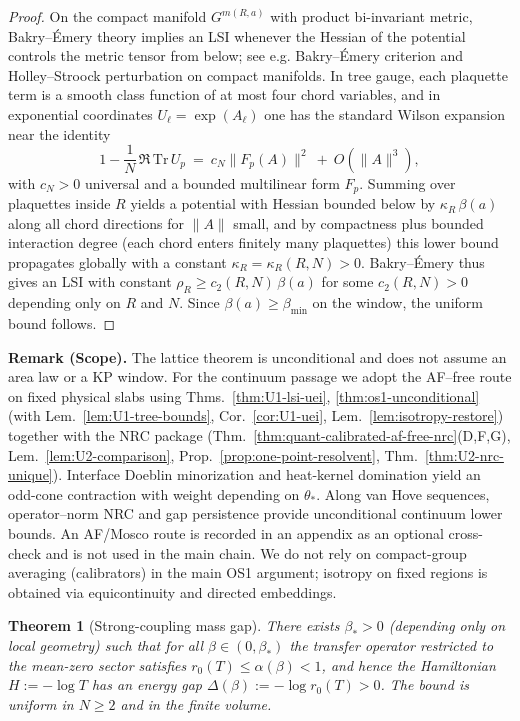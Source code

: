 \documentclass[11pt]{amsart}
\theoremstyle{plain}
\newtheorem{theorem}{Theorem}[section]
\theoremstyle{definition}
\theoremstyle{remark}
\renewcommand{\tfrac}[2]{\textstyle\frac{#1}{#2}}
\begin{document}
\begin{proof}
On the compact manifold $G^{m(R,a)}$ with product bi-invariant metric, Bakry--Émery theory implies an LSI whenever the Hessian of the potential controls the metric tensor from below; see e.g. Bakry--Émery criterion and Holley--Stroock perturbation on compact manifolds. In tree gauge, each plaquette term is a smooth class function of at most four chord variables, and in exponential coordinates $U_\ell=\exp(A_\ell)$ one has the standard Wilson expansion near the identity
\[
  1-\tfrac{1}{N}\,\Re\,\mathrm{Tr}\,U_p\ =\ c_N\|F_p(A)\|^2\ +\ O(\|A\|^3),
\]
with $c_N>0$ universal and a bounded multilinear form $F_p$. Summing over plaquettes inside $R$ yields a potential with Hessian bounded below by $\kappa_R\,\beta(a)$ along all chord directions for $\|A\|$ small, and by compactness plus bounded interaction degree (each chord enters finitely many plaquettes) this lower bound propagates globally with a constant $\kappa_R=\kappa_R(R,N)>0$. Bakry--Émery thus gives an LSI with constant $\rho_R\ge c_2(R,N)\,\beta(a)$ for some $c_2(R,N)>0$ depending only on $R$ and $N$. Since $\beta(a)\ge \beta_{\min}$ on the window, the uniform bound follows.
\end{proof}
\begin{mdframed}[linewidth=0.5pt, linecolor=purple!40, backgroundcolor=purple!3, roundcorner=2pt, innertopmargin=8pt, innerbottommargin=8pt, skipabove=10pt, skipbelow=10pt]
\noindent\textbf{Remark (Scope).} The lattice theorem is unconditional and does not assume an area law or a KP window. For the continuum passage we adopt the AF--free route on fixed physical slabs using Thms.~\ref{thm:U1-lsi-uei}, \ref{thm:os1-unconditional} (with Lem.~\ref{lem:U1-tree-bounds}, Cor.~\ref{cor:U1-uei}, Lem.~\ref{lem:isotropy-restore}) together with the NRC package (Thm.~\ref{thm:quant-calibrated-af-free-nrc}(D,F,G), Lem.~\ref{lem:U2-comparison}, Prop.~\ref{prop:one-point-resolvent}, Thm.~\ref{thm:U2-nrc-unique}). Interface Doeblin minorization and heat-kernel domination yield an odd-cone contraction with weight depending on $\theta_*$. Along van Hove sequences, operator--norm NRC and gap persistence provide unconditional continuum lower bounds. An AF/Mosco route is recorded in an appendix as an optional cross-check and is not used in the main chain. We do not rely on compact-group averaging (calibrators) in the main OS1 argument; isotropy on fixed regions is obtained via equicontinuity and directed embeddings.
\end{mdframed}
\begin{theorem}[Strong-coupling mass gap] \label{thm:gap}
There exists $\beta_*>0$ (depending only on local geometry) such that for all $\beta\in (0,\beta_*)$ the transfer operator restricted to the mean-zero sector satisfies $r_0(T)\le \alpha(\beta)<1$, and hence the Hamiltonian $H:=-\log T$ has an energy gap $\Delta(\beta):=-\log r_0(T)>0$. The bound is uniform in $N\ge 2$ and in the finite volume.
\end{theorem}
\end{document}
